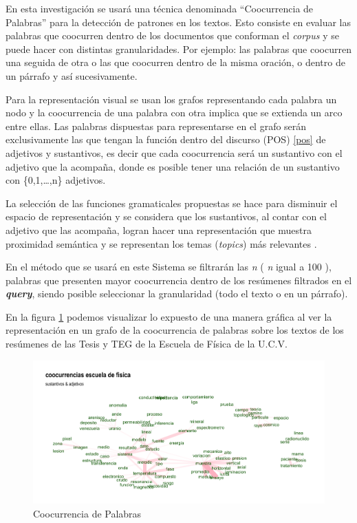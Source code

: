 \documentclass[
  10,
  spanish,
  openany]{book}
\begin{document}
En esta investigación se usará una técnica denominada ``Coocurrencia de Palabras'' para la detección de patrones en los textos. Esto consiste en evaluar las palabras que coocurren dentro de los documentos que conforman el \emph{corpus} y se puede hacer con distintas granularidades. Por ejemplo: las palabras que coocurren una seguida de otra o las que coocurren dentro de la misma oración, o dentro de un párrafo y así sucesivamente.

Para la representación visual se usan los grafos representando cada palabra un nodo y la coocurrencia de una palabra con otra implica que se extienda un arco entre ellas. Las palabras dispuestas para representarse en el grafo serán exclusivamente las que tengan la función dentro del discurso (POS) \ref{pos} de adjetivos y sustantivos, es decir que cada coocurrencia será un sustantivo con el adjetivo que la acompaña, donde es posible tener una relación de un sustantivo con \{0,1,\ldots,n\} adjetivos.

La selección de las funciones gramaticales propuestas se hace para disminuir el espacio de representación y se considera que los sustantivos, al contar con el adjetivo que las acompaña, logran hacer una representación que muestra proximidad semántica y se representan los temas (\emph{topics}) más relevantes \citep{segev2021}.

En el método que se usará en este Sistema se filtrarán las \emph{n} ( \emph{n} igual a 100 ), palabras que presenten mayor coocurrencia dentro de los resúmenes filtrados en el \textbf{\emph{query}}, siendo posible seleccionar la granularidad (todo el texto o en un párrafo).

En la figura \ref{fig:coocejem} podemos visualizar lo expuesto de una manera gráfica al ver la representación en un grafo de la coocurrencia de palabras sobre los textos de los resúmenes de las Tesis y TEG de la Escuela de Física de la U.C.V.

\begin{figure}

{\centering \includegraphics[width=0.9\linewidth]{images/02-marco-teorico/cooc} 

}

\caption{Coocurrencia de Palabras}\label{fig:coocejem}
\end{figure}
\end{document}

